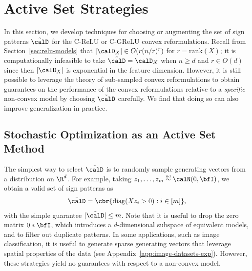 
\section{Active Set Strategies}\label{app:active-set}

In this section, we develop techniques for choosing or augmenting the set of sign patterns \( \tilde \calD \) for the C-ReLU or C-GReLU convex reformulations.
Recall from Section~\ref{sec:relu-models} that \( |\calD_X| \in O(r (n/r)^r )\) for \( r = \text{rank}(X) \);
it is computationally infeasible to take \( \tilde \calD = \calD_X \) when \( n \geq d \) and \( r \in O(d) \) since then \( |\calD_X| \) is exponential in the feature dimension.
However, it is still possible to leverage the theory of sub-sampled convex reformulations to obtain guarantees on the performance of the convex reformulations relative to a \emph{specific} non-convex model by choosing \( \tilde \calD \) carefully.
We find that doing so can also improve generalization in practice.

\subsection{Stochastic Optimization as an Active Set Method}

The simplest way to select \( \tilde \calD \) is to randomly sample generating vectors from a distribution on \( \R^d \).
For example, taking \( z_1, \ldots, z_m \stackrel{\text{\rm \tiny iid}}{\sim} \calN(0, \bfI) \), we obtain a valid set of sign patterns as
\[
	\tilde \calD = \cbr{\text{diag}(X z_i > 0) : i \in [m]},
\]
with the simple guarantee \( |\tilde \calD| \leq m \).
Note that it is useful to drop the zero matrix \( 0 * \bfI \), which introduces a \( d \)-dimensional subspace of equivalent models, and to filter out duplicate patterns.
In some applications, such as image classification, it is useful to generate sparse generating vectors that leverage spatial properties of the data (see Appendix~\ref{app:image-datasets-exp}).
However, these strategies yield no guarantees with respect to a non-convex model.

